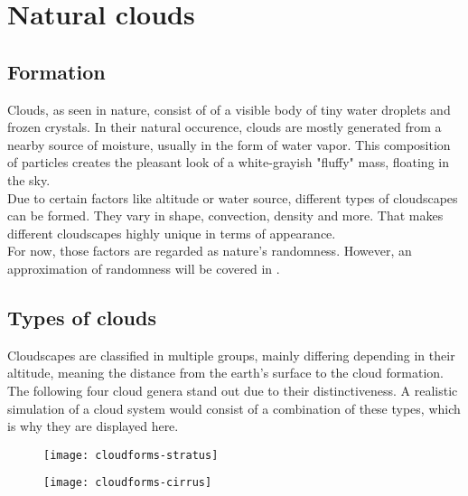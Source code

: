 \section{Natural clouds}

\subsection{Formation}
Clouds, as seen in nature, consist of of a visible body of tiny water droplets and frozen crystals. 
In their natural occurence, clouds are mostly generated from a nearby source of moisture, usually in the form of water vapor. 
This composition of particles creates the pleasant look of a white-grayish "fluffy" mass, floating in the sky.
\\
Due to certain factors like altitude or water source, different types of cloudscapes can be formed. They vary in shape, \gls{convection}, density and more.
That makes different cloudscapes highly unique in terms of appearance.
\\
For now, those factors are regarded as nature's randomness. However, an approximation of randomness will be covered in .


\subsection{Types of clouds}
\label{section:cloud-types}
Cloudscapes are classified in multiple groups, mainly differing depending in their altitude, meaning the distance from the earth's surface to the cloud formation.
The following four cloud genera stand out due to their distinctiveness. A realistic simulation of a cloud system would consist of a combination of these types, which is why they are displayed here.
\begin{figure}[ht]
    \centering
        \begin{minipage}{0.47\linewidth}
            \texttt{[image: cloudforms-stratus]}
            \label{img:photo:cloudforms-stratus}        
        \end{minipage}        
    \hfill
        \begin{minipage}{0.47\linewidth}
            \texttt{[image: cloudforms-cirrus]}
            \label{img:photo:cloudforms-cirrus}        
        \end{minipage}
\end{figure}

